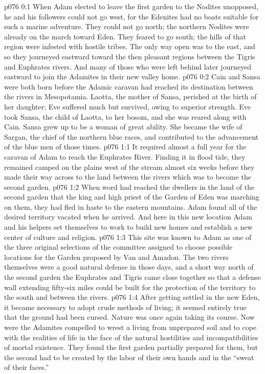 \author{Solonia}
\vs p076 0:1 When Adam elected to leave the first garden to the Nodites unopposed, he and his followers could not go west, for the Edenites had no boats suitable for such a marine adventure. They could not go north; the northern Nodites were already on the march toward Eden. They feared to go south; the hills of that region were infested with hostile tribes. The only way open was to the east, and so they journeyed eastward toward the then pleasant regions between the Tigris and Euphrates rivers. And many of those who were left behind later journeyed eastward to join the Adamites in their new valley home.
\pc \vs p076 0:2 Cain and Sansa were both born before the Adamic caravan had reached its destination between the rivers in Mesopotamia. Laotta, the mother of Sansa, perished at the birth of her daughter; Eve suffered much but survived, owing to superior strength. Eve took Sansa, the child of Laotta, to her bosom, and she was reared along with Cain. Sansa grew up to be a woman of great ability. She became the wife of Sargan, the chief of the northern blue races, and contributed to the advancement of the blue men of those times.\plustwo
{}
\vs p076 1:1 It required almost a full year for the caravan of Adam to reach the Euphrates River. Finding it in flood tide, they remained camped on the plains west of the stream almost six weeks before they made their way across to the land between the rivers which was to become the second garden.
\vs p076 1:2 When word had reached the dwellers in the land of the second garden that the king and high priest of the Garden of Eden was marching on them, they had fled in haste to the eastern mountains. Adam found all of the desired territory vacated when he arrived. And here in this new location Adam and his helpers set themselves to work to build new homes and establish a new center of culture and religion.
\vs p076 1:3 This site was known to Adam as one of the three original selections of the committee assigned to choose possible locations for the Garden proposed by Van and Amadon. The two rivers themselves were a good natural defense in those days, and a short way north of the second garden the Euphrates and Tigris came close together so that a defense wall extending fifty\hyp{}six miles could be built for the protection of the territory to the south and between the rivers.
\pc \vs p076 1:4 After getting settled in the new Eden, it became necessary to adopt crude methods of living; it seemed entirely true that the ground had been cursed. Nature was once again taking its course. Now were the Adamites compelled to wrest a living from unprepared soil and to cope with the realities of life in the face of the natural hostilities and incompatibilities of mortal existence. They found the first garden partially prepared for them, but the second had to be created by the labor of their own hands and in the “sweat of their faces.”
